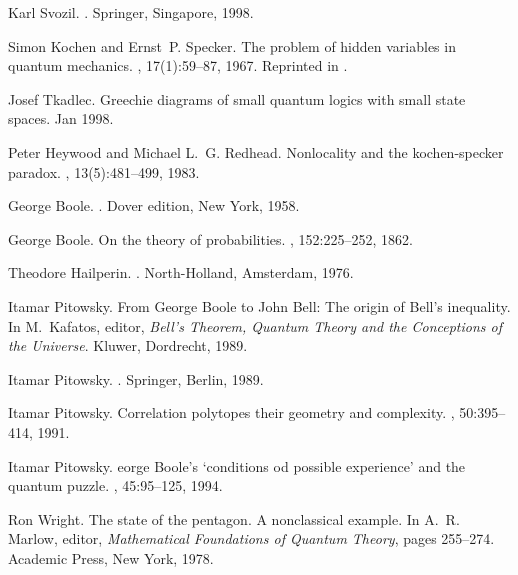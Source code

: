 \begin{thebibliography}{10}

Karl Svozil.
.
\newblock Springer, Singapore, 1998.

Simon Kochen and Ernst~P. Specker.
\newblock The problem of hidden variables in quantum mechanics.
, 17(1):59--87, 1967.
\newblock Reprinted in \cite[pp. 235--263]{specker-ges}.

Josef Tkadlec.
\newblock Greechie diagrams of small quantum logics with small state spaces.
\newblock Jan 1998.

Peter Heywood and Michael L.~G. Redhead.
\newblock Nonlocality and the kochen-specker paradox.
, 13(5):481--499, 1983.

George Boole.
.
\newblock Dover edition, New York, 1958.

George Boole.
\newblock On the theory of probabilities.
,
  152:225--252, 1862.

Theodore Hailperin.
.
\newblock North-Holland, Amsterdam, 1976.

Itamar Pitowsky.
\newblock From {G}eorge {B}oole to {J}ohn {B}ell: The origin of {B}ell's
  inequality.
\newblock In M.~Kafatos, editor, {\em {B}ell's Theorem, Quantum Theory and the
  Conceptions of the Universe}. Kluwer, Dordrecht, 1989.

Itamar Pitowsky.
.
\newblock Springer, Berlin, 1989.

Itamar Pitowsky.
\newblock Correlation polytopes their geometry and complexity.
, 50:395--414, 1991.

Itamar Pitowsky.
eorge {B}oole's `conditions od possible experience' and the
  quantum puzzle.
, 45:95--125, 1994.

Ron Wright.
\newblock The state of the pentagon. {A} nonclassical example.
\newblock In A.~R. Marlow, editor, {\em Mathematical Foundations of Quantum
  Theory}, pages 255--274. Academic Press, New York, 1978.


\end{thebibliography}
